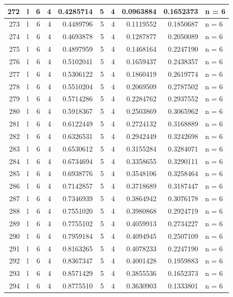 \documentclass[
  letterpaper,
  DIV=11,
  numbers=noendperiod]{scrreprt}
\begin{document}
\begin{table}
\begin{tabular}[t]{r|l|r|r|r|r|r|r|r|l}
\hline
272 & l & 6 & 4 & 0.4285714 & 5 & 4 & 0.0963884 & 0.1652373 & n = 6\\
\hline
273 & l & 6 & 4 & 0.4489796 & 5 & 4 & 0.1119552 & 0.1850687 & n = 6\\
\hline
274 & l & 6 & 4 & 0.4693878 & 5 & 4 & 0.1287877 & 0.2050089 & n = 6\\
\hline
275 & l & 6 & 4 & 0.4897959 & 5 & 4 & 0.1468164 & 0.2247190 & n = 6\\
\hline
276 & l & 6 & 4 & 0.5102041 & 5 & 4 & 0.1659437 & 0.2438357 & n = 6\\
\hline
277 & l & 6 & 4 & 0.5306122 & 5 & 4 & 0.1860419 & 0.2619774 & n = 6\\
\hline
278 & l & 6 & 4 & 0.5510204 & 5 & 4 & 0.2069509 & 0.2787502 & n = 6\\
\hline
279 & l & 6 & 4 & 0.5714286 & 5 & 4 & 0.2284762 & 0.2937552 & n = 6\\
\hline
280 & l & 6 & 4 & 0.5918367 & 5 & 4 & 0.2503869 & 0.3065962 & n = 6\\
\hline
281 & l & 6 & 4 & 0.6122449 & 5 & 4 & 0.2724132 & 0.3168889 & n = 6\\
\hline
282 & l & 6 & 4 & 0.6326531 & 5 & 4 & 0.2942449 & 0.3242698 & n = 6\\
\hline
283 & l & 6 & 4 & 0.6530612 & 5 & 4 & 0.3155284 & 0.3284071 & n = 6\\
\hline
284 & l & 6 & 4 & 0.6734694 & 5 & 4 & 0.3358655 & 0.3290111 & n = 6\\
\hline
285 & l & 6 & 4 & 0.6938776 & 5 & 4 & 0.3548106 & 0.3258464 & n = 6\\
\hline
286 & l & 6 & 4 & 0.7142857 & 5 & 4 & 0.3718689 & 0.3187447 & n = 6\\
\hline
287 & l & 6 & 4 & 0.7346939 & 5 & 4 & 0.3864942 & 0.3076178 & n = 6\\
\hline
288 & l & 6 & 4 & 0.7551020 & 5 & 4 & 0.3980868 & 0.2924719 & n = 6\\
\hline
289 & l & 6 & 4 & 0.7755102 & 5 & 4 & 0.4059913 & 0.2734227 & n = 6\\
\hline
290 & l & 6 & 4 & 0.7959184 & 5 & 4 & 0.4094945 & 0.2507109 & n = 6\\
\hline
291 & l & 6 & 4 & 0.8163265 & 5 & 4 & 0.4078233 & 0.2247190 & n = 6\\
\hline
292 & l & 6 & 4 & 0.8367347 & 5 & 4 & 0.4001428 & 0.1959883 & n = 6\\
\hline
293 & l & 6 & 4 & 0.8571429 & 5 & 4 & 0.3855536 & 0.1652373 & n = 6\\
\hline
294 & l & 6 & 4 & 0.8775510 & 5 & 4 & 0.3630903 & 0.1333801 & n = 6\\

\end{tabular}
\end{table}
\end{document}
